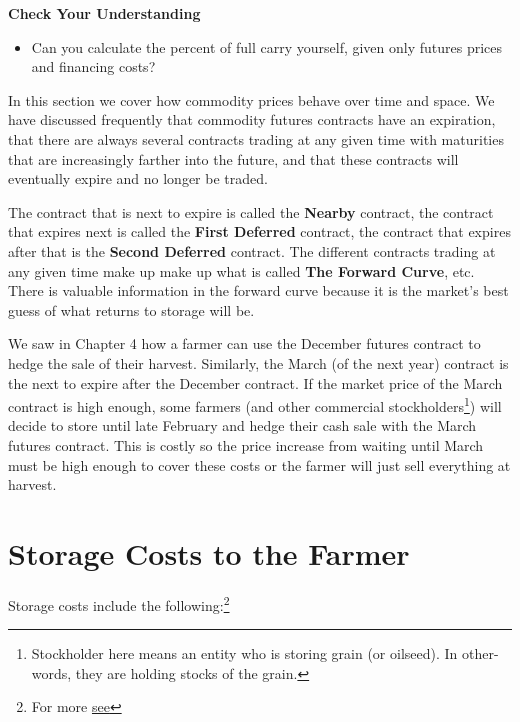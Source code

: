 \documentclass[
  letterpaper,
  DIV=11,
  numbers=noendperiod]{scrreprt}
\providecommand{\tightlist}{%
  \setlength{\itemsep}{0pt}\setlength{\parskip}{0pt}}\usepackage{longtable,booktabs,array}
\begin{document}
\textbf{Check Your Understanding}

\begin{itemize}
\tightlist
\item
  Can you calculate the percent of full carry yourself, given only
  futures prices and financing costs?
\end{itemize}

In this section we cover how commodity prices behave over time and
space. We have discussed frequently that commodity futures contracts
have an expiration, that there are always several contracts trading at
any given time with maturities that are increasingly farther into the
future, and that these contracts will eventually expire and no longer be
traded.

The contract that is next to expire is called the \textbf{Nearby}
contract, the contract that expires next is called the \textbf{First
Deferred} contract, the contract that expires after that is the
\textbf{Second Deferred} contract. The different contracts trading at
any given time make up make up what is called \textbf{The Forward
Curve}, etc. There is valuable information in the forward curve because
it is the market's best guess of what returns to storage will be.

We saw in Chapter 4 how a farmer can use the December futures contract
to hedge the sale of their harvest. Similarly, the March (of the next
year) contract is the next to expire after the December contract. If the
market price of the March contract is high enough, some farmers (and
other commercial stockholders\footnote{Stockholder here means an entity
  who is storing grain (or oilseed). In other-words, they are holding
  stocks of the grain.}) will decide to store until late February and
hedge their cash sale with the March futures contract. This is costly so
the price increase from waiting until March must be high enough to cover
these costs or the farmer will just sell everything at harvest.

\hypertarget{storage-costs-to-the-farmer}{%
\section{Storage Costs to the
Farmer}\label{storage-costs-to-the-farmer}}

Storage costs include the following:\footnote{For more
  \href{https://www.extension.iastate.edu/agdm/crops/pdf/a2-33.pdf}{see}}
\end{document}
